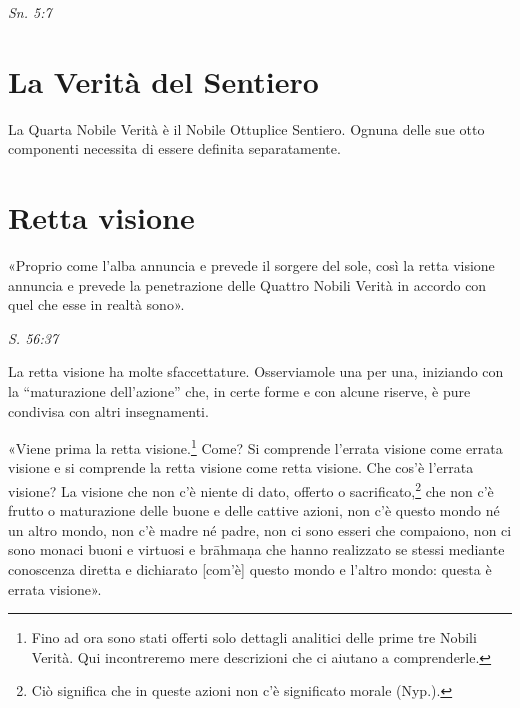 \emph{Sn. 5:7}


\hypertarget{x-la-verità-del-sentiero}{\section*{La Verità del Sentiero}}
 La Quarta Nobile Verità è il Nobile Ottuplice
Sentiero. Ognuna delle sue otto componenti necessita di essere definita
separatamente.


\hypertarget{x-retta-visione}{\section*{Retta visione}}
 «Proprio come l’alba annuncia e prevede il sorgere del sole,
così la retta visione annuncia e prevede la penetrazione delle Quattro
Nobili Verità in accordo con quel che esse in realtà sono».


\emph{S. 56:37}


 La retta visione ha molte sfaccettature. Osserviamole
una per una, iniziando con la “maturazione dell’azione” che, in certe
forme e con alcune riserve, è pure condivisa con altri insegnamenti.


 «Viene prima la retta visione.\footnote{Fino ad ora sono stati offerti solo dettagli analitici delle prime tre Nobili Verità. Qui incontreremo mere descrizioni che ci aiutano a comprenderle.} Come? Si
comprende l’errata visione come errata visione e si comprende la retta
visione come retta visione. Che cos’è l’errata visione? La visione che
non c’è niente di dato, offerto o sacrificato,\footnote{Ciò significa che in queste azioni non c’è significato morale (Nyp.).} che
non c’è frutto o maturazione delle buone e delle cattive azioni, non c’è
questo mondo né un altro mondo, non c’è madre né padre, non ci sono
esseri che compaiono, non ci sono monaci buoni e virtuosi e brāhmaṇa che
hanno realizzato se stessi mediante conoscenza diretta e dichiarato
[com’è] questo mondo e l’altro mondo: questa è errata visione».


